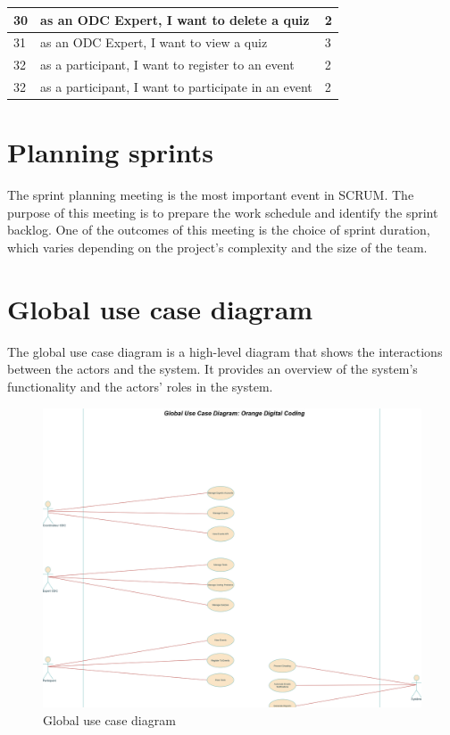 \begin{longtable}{|l|l|l|}
      30                     & as an ODC Expert, I want to delete a quiz                & 2                 \\ \hline
      31                     & as an ODC Expert, I want to view a quiz                  & 3                 \\ \hline
      32                     & as a participant, I want to register to an event         & 2                 \\ \hline
      32                     & as a participant, I want to participate in an event      & 2                 \\ \hline
\end{longtable}


\section{Planning sprints}
The sprint planning meeting is the most important event in SCRUM. The purpose
of this meeting is to prepare the work schedule and identify the sprint
backlog. One of the outcomes of this meeting is the choice of sprint duration,
which varies depending on the project's complexity and the size of the team.

\section{Global use case diagram}
The global use case diagram is a high-level diagram that shows the interactions
between the actors and the system. It provides an overview of the system's
functionality and the actors' roles in the system.
\begin{figure}[h!]
      \centering
      \includegraphics[width=1\textwidth]{images/useCaseGlobal.png}
      \caption{Global use case diagram}
      \label{fig:use_case_diagram}
\end{figure}

